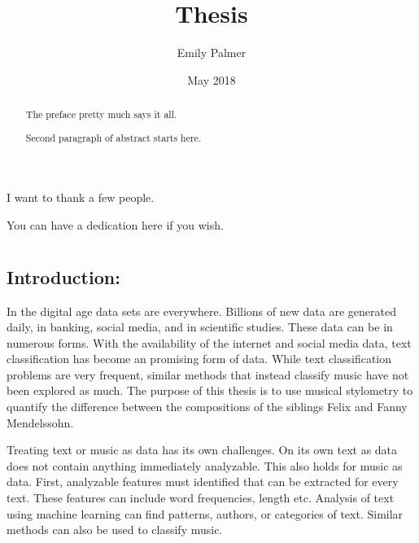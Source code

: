 \documentclass[12pt,twoside]{reedthesis}
\title{Thesis}
\author{Emily Palmer}
\date{May 2018}
\theoremstyle{definition}
\theoremstyle{definition}
\theoremstyle{definition}
\theoremstyle{remark}
\begin{document}
  \maketitle

\frontmatter %
\pagestyle{empty} %
  \begin{acknowledgements}
    I want to thank a few people.
  \end{acknowledgements}

  \hypersetup{linkcolor=black}
  \setcounter{tocdepth}{2}
  \tableofcontents

  \listoftables

  \listoffigures
  \begin{abstract}
    The preface pretty much says it all. \par
    
    Second paragraph of abstract starts here.
  \end{abstract}
  \begin{dedication}
    You can have a dedication here if you wish.
  \end{dedication}
\mainmatter %
\pagestyle{fancyplain} %

\chapter{}\label{section}

\section{Introduction:}\label{introduction}

In the digital age data sets are everywhere. Billions of new data are
generated daily, in banking, social media, and in scientific studies.
These data can be in numerous forms. With the availability of the
internet and social media data, text classification has become an
promising form of data. While text classification problems are very
frequent, similar methods that instead classify music have not been
explored as much. The purpose of this thesis is to use musical
stylometry to quantify the difference between the compositions of the
siblings Felix and Fanny Mendelssohn.

Treating text or music as data has its own challenges. On its own text
as data does not contain anything immediately analyzable. This also
holds for music as data. First, analyzable features must identified that
can be extracted for every text. These features can include word
frequencies, length etc. Analysis of text using machine learning can
find patterns, authors, or categories of text. Similar methods can also
be used to classify music.
\end{document}
